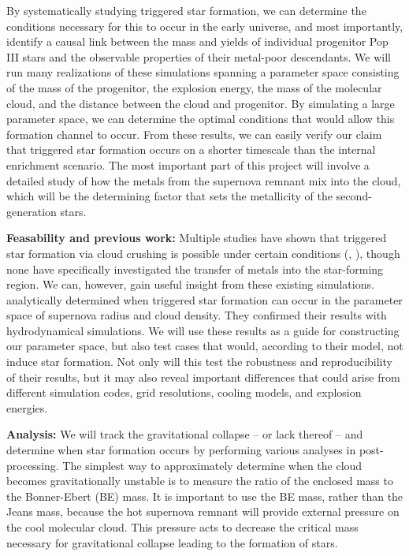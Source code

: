 \documentclass[a4paper, 12pt]{article}
\begin{document}
By systematically studying triggered star formation, we can determine the conditions necessary for this to occur in the early universe, and most importantly, identify a causal link between the mass and yields of individual progenitor Pop III stars and the observable properties of their metal-poor descendants. We will run many realizations of these simulations spanning a parameter space consisting of the mass of the progenitor, the explosion energy, the mass of the molecular cloud, and the distance between the cloud and progenitor. By simulating a large parameter space, we can determine the optimal conditions that would allow this formation channel to occur. From these results, we can easily verify our claim that triggered star formation occurs on a shorter timescale than the internal enrichment scenario. The most important part of this project will involve a detailed study of how the metals from the supernova remnant mix into the cloud, which will be the determining factor that sets the metallicity of the second-generation stars.

\textbf{Feasability and previous work:} Multiple studies have shown that triggered star formation via cloud crushing is possible under certain conditions (\cite{Melioli2006}, \cite{Leao2009}), though none have specifically investigated the transfer of metals into the star-forming region. We can, however, gain useful insight from these existing simulations. \cite{Melioli2006} analytically determined when triggered star formation can occur in the parameter space of supernova radius and cloud density. They confirmed their results with hydrodynamical simulations. We will use these results as a guide for constructing our parameter space, but also test cases that would, according to their model, not induce star formation. Not only will this test the robustness and reproducibility of their results, but it may also reveal important differences that could arise from different simulation codes, grid resolutions, cooling models, and explosion energies.

\textbf{Analysis:} We will track the gravitational collapse -- or lack thereof -- and determine when star formation occurs by performing various analyses in post-processing. The simplest way to approximately determine when the cloud becomes gravitationally unstable is to measure the ratio of the enclosed mass to the Bonner-Ebert (BE) mass. It is important to use the BE mass, rather than the Jeans mass, because the hot supernova remnant will provide external pressure on the cool molecular cloud. This pressure acts to decrease the critical mass necessary for gravitational collapse leading to the formation of stars.
\end{document}
